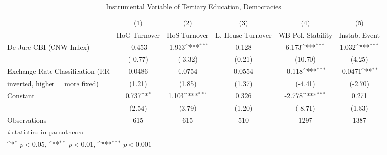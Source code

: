 \begin{table}[htbp]\centering
\def\sym#1{\ifmmode^{#1}\else\(^{#1}\)\fi}
\caption{Instrumental Variable of Tertiary Education, Democracies \label{demIfivs}}
\begin{tabular}{l*{5}{c}}
\toprule
                                        &\multicolumn{1}{c}{(1)}&\multicolumn{1}{c}{(2)}&\multicolumn{1}{c}{(3)}&\multicolumn{1}{c}{(4)}&\multicolumn{1}{c}{(5)}\\
                                        &\multicolumn{1}{c}{HoG Turnover}&\multicolumn{1}{c}{HoS Turnover}&\multicolumn{1}{c}{L. House Turnover}&\multicolumn{1}{c}{WB Pol. Stability}&\multicolumn{1}{c}{Instab. Event}\\
\midrule
De Jure CBI (CNW Index)                 &   -0.453         &   -1.933\sym{***}&    0.128         &    6.173\sym{***}&    1.032\sym{***}\\
                                        &  (-0.77)         &  (-3.32)         &   (0.21)         &  (10.70)         &   (4.25)         \\
\addlinespace
Exchange Rate Classification (RR        &   0.0486         &   0.0754         &   0.0554         &   -0.118\sym{***}&  -0.0471\sym{**} \\
inverted, higher = more fixed)          &   (1.21)         &   (1.85)         &   (1.37)         &  (-4.41)         &  (-2.70)         \\
\addlinespace
Constant                                &    0.737\sym{*}  &    1.103\sym{***}&    0.326         &   -2.778\sym{***}&    0.271         \\
                                        &   (2.54)         &   (3.79)         &   (1.20)         &  (-8.71)         &   (1.83)         \\
\midrule
Observations                            &      615         &      615         &      510         &     1297         &     1387         \\
\bottomrule
\multicolumn{6}{l}{\footnotesize \textit{t} statistics in parentheses}\\
\multicolumn{6}{l}{\footnotesize \sym{*} \(p<0.05\), \sym{**} \(p<0.01\), \sym{***} \(p<0.001\)}\\
\end{tabular}
\end{table}
